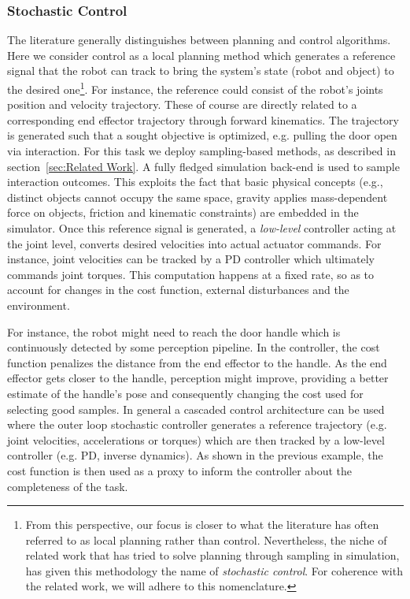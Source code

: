 \subsubsection{Stochastic Control}\label{sec:pred_control}
The literature generally distinguishes between planning and control algorithms. Here we consider control as a local planning method which generates a reference signal that the robot can track to bring the system's state (robot and object) to the desired one\footnote{From this perspective, our focus is closer to what the literature has often referred to as local planning rather than control.
Nevertheless, the niche of related work that has tried to solve planning through sampling in simulation, has given this methodology the name of \emph{stochastic control}. For coherence with the related work, we will adhere to this nomenclature.}. For instance, the reference could consist of the robot's joints position and velocity trajectory. These of course are directly related to a corresponding end effector trajectory through forward kinematics. The trajectory is generated such that a sought objective is optimized, e.g. pulling the door open via interaction. For this task we deploy sampling-based methods, as described in section~\ref{sec:Related Work}. A fully fledged simulation back-end is used to sample interaction outcomes. This exploits the fact that basic physical concepts (e.g., distinct objects cannot occupy the same space, gravity applies mass-dependent force on objects, friction and kinematic constraints) are embedded in the simulator. Once this reference signal is generated, a \emph{low-level} controller acting at the joint level, converts desired velocities into actual actuator commands. For instance, joint velocities can be tracked by a PD controller which ultimately commands joint torques. This computation happens at a fixed rate, so as to account for changes in the cost function, external disturbances and the environment.

For instance, the robot might need to reach the door handle which is continuously detected by some perception pipeline. In the controller, the cost function penalizes the distance from the end effector to the handle. As the end effector gets closer to the handle, perception might improve, providing a better estimate of the handle's pose and consequently changing the cost used for selecting good samples. In general a cascaded control architecture can be used where the outer loop stochastic controller generates a reference trajectory (e.g. joint velocities, accelerations or torques) which are then tracked by a low-level controller (e.g. PD, inverse dynamics).  
As shown in the previous example, the cost function is then used as a proxy to inform the controller about the completeness of the task. 

